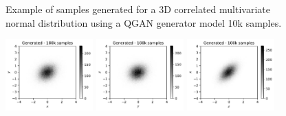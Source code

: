 \documentclass[twocolumn,preprintnumbers,superscriptaddress]{revtex4-2}
\begin{document}
\begin{figure}
  \caption{\label{fig:3dgauss}Example of samples generated for a 3D correlated
    multivariate normal distribution using a QGAN generator model 10k samples.}
\end{figure}

\begin{figure}

  \includegraphics[width=0.3\textwidth]{plots/3Dgaussian_posdef/1-2_FAKE_100k.pdf}%
  \includegraphics[width=0.3\textwidth]{plots/3Dgaussian_posdef/2-3_FAKE_100k.pdf}%
  \includegraphics[width=0.3\textwidth]{plots/3Dgaussian_posdef/3-1_FAKE_100k.pdf}


\end{figure}
\end{document}
